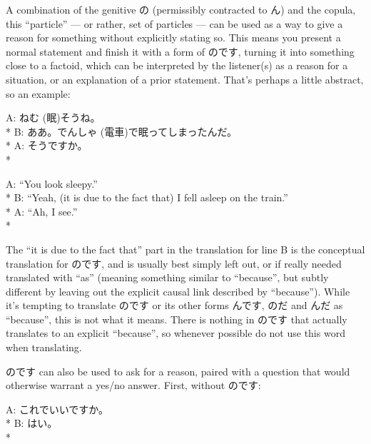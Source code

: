 \documentclass[11pt, b5paper, twoside, openright, onecolumn]{book}
\makeatletter
\newcommand*{\rubystack}[2]{{\relscale{0.5}%
  \begin{tabular}[b]{@{}c@{}}%
    {#1}\\%
   {\textscale{2}{#2}}%
  \end{tabular}}%
}
\DeclareRobustCommand*{\ruby}[2]{%
  \mbox{%
    \setlength{\parskip}{0ex}%
    \BeginAccSupp{method=pdfstringdef,ActualText={#1}}%
      \rubystack{\phantom{#2}}{#1}%
      \llap{%
        \rubystack{#2}{\phantom{#1}}%
      }%
    \EndAccSupp{}%
  }%
}
\renewcommand*{\ruby}[2]{#2 (#1)}%
\newenvironment{exampleblock}{
\setlength{\parindent}{0.6in}
\begin{minipage}[t]{\dimexpr\textwidth-\parindent}}
{\end{minipage}}
\makeatother
\begin{document}
A combination of the genitive の (permissibly contracted to ん) and the copula‚ this “particle” — or rather‚ set of particles — can be used as a way to give a reason for something without explicitly stating so. This means you present a normal statement and finish it with a form of のです‚ turning it into something close to a factoid‚ which can be interpreted by the listener(s) as a reason for a situation‚ or an explanation of a prior statement. That’s perhaps a little abstract‚ so an example:

\vspace{0.4cm}
\begin{exampleblock}
A: \ruby{眠}{ねむ}そうね。 \\* 
B: ああ。\ruby{電車}{でんしゃ}で眠ってしまったんだ。 \\* 
A: そうですか。 \\* 
\end{exampleblock}
\vspace{0.2cm}

\begin{exampleblock}
A: “You look sleepy.” \\* 
B: “Yeah‚ (it is due to the fact that) I fell asleep on the train.” \\* 
A: “Ah‚ I see.” \\* 
\end{exampleblock}
\vspace{0.2cm}

The “it is due to the fact that” part in the translation for line B is the conceptual translation for のです‚ and is usually best simply left out‚ or if really needed translated with “as” (meaning something similar to “because”‚ but subtly different by leaving out the explicit causal link described by “because”). While it’s tempting to translate のです or its other forms んです‚ のだ and んだ as “because”‚ this is not what it means. There is nothing in のです that actually translates to an explicit “because”‚ so whenever possible do not use this word when translating.

のです can also be used to ask for a reason‚ paired with a question that would otherwise warrant a yes/no answer. First‚ without のです:

\vspace{0.4cm}
\begin{exampleblock}
A: これでいいですか。 \\* 
B: はい。 \\* 
\end{exampleblock}
\vspace{0.2cm}
\end{document}
